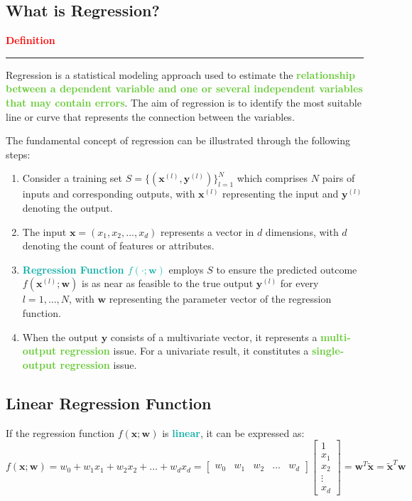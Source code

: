 \documentclass[twoside]{article}
\newcommand{\definition}[1]{\begin{definitionbox} \textcolor{red}{{\scriptsize\faStar} \textbf{Definition}} \newline \rule{\textwidth}{0.5pt}  \newline #1 \end{definitionbox}}
\newcommand{\highlightbluetext}[1]{\textcolor[HTML]{09ACA6}{\textbf{#1}}}
\newcommand{\highlightgreentext}[1]{\textcolor[HTML]{62C92F}{\textbf{#1}}}
\numberwithin{equation}{section}
\begin{document}
	\subsection{What is Regression?}
	\label{subsec:WhatIsRegression}

	\definition{Regression is a statistical modeling approach used to estimate the \highlightgreentext{relationship between a dependent variable and one or several independent variables that may contain errors}. The aim of regression is to identify the most suitable line or curve that represents the connection between the variables.}

	The fundamental concept of regression can be illustrated through the following steps: 
	\begin{enumerate}
		\item Consider a training set $S = \{(\mathbf{x}^{(l)}, \mathbf{y}^{(l)})\}_{l=1}^N$ which comprises $N$ pairs of inputs and corresponding outputs, with $\mathbf{x}^{(l)}$ representing the input and $\mathbf{y}^{(l)}$ denoting the output. 
		\item The input $\mathbf{x} = (x_1, x_2, \ldots, x_d)$ represents a vector in $d$ dimensions, with $d$ denoting the count of features or attributes. 
		\item \highlightbluetext{Regression Function $f(\cdot ; \mathbf{w})$} employs $S$ to ensure the predicted outcome $f(\mathbf{x}^{(l)} ; \mathbf{w})$ is as near as feasible to the true output $\mathbf{y}^{(l)}$ for every $l = 1, \ldots, N$, with $\mathbf{w}$ representing the parameter vector of the regression function. 
		\item When the output $\mathbf{y}$ consists of a multivariate vector, it represents a \highlightgreentext{multi-output regression} issue. For a univariate result, it constitutes a \highlightgreentext{single-output regression} issue. 
	\end{enumerate}

	\subsection{Linear Regression Function}
	\label{subsec:LinearRegressionFunction}
	If the regression function $f(\mathbf{x} ; \mathbf{w})$ is \highlightbluetext{linear}, it can be expressed as:
	\begin{equation}
	\label{eq:LinearRegressionFunction}
	\boxed{f(\mathbf{x} ; \mathbf{w}) = w_0 + w_1 x_1 + w_2 x_2 + \ldots + w_d x_d = \begin{bmatrix} w_0 & w_1 & w_2 & \ldots & w_d \end{bmatrix} \begin{bmatrix} 1 \\ x_1 \\ x_2 \\ \vdots \\ x_d \end{bmatrix} = \mathbf{w}^T \mathbf{\tilde{x}} = \mathbf{\tilde{x}}^T \mathbf{w}}
	\end{equation}
	
\end{document}
